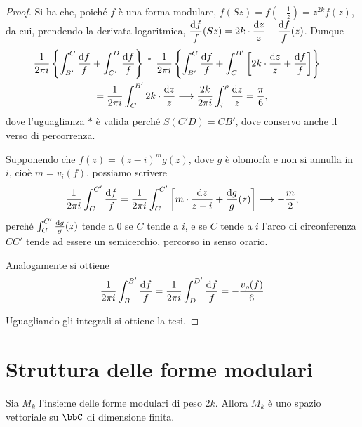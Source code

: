 \begin{proof}
	Si ha che, poiché $f$ è una forma modulare, $f(Sz)=f(-\frac{1}{z})=z^{2k}f(z)$, da cui, prendendo la derivata logaritmica,
	$\displaystyle\frac{\text{d} f}{f}(Sz)=2k\cdot\frac{\text{d} z}{z}+\frac{\text{d} f}{f}(z)$. Dunque
	\begin{multline}
		\frac{1}{2\pi i}\left\{ \int_{B'}^C\frac{\de f}{f} + \int_{C'}^D\frac{\de f}{f} \right\} \overset{*}{=} %
		\frac{1}{2\pi i}\left\{ \int_{B'}^C\frac{\de f}{f} + \int_{C}^{B'} \left[2k \cdot \frac{\de z}{z} + \frac{\de f}{f}\right] \right\} = \\
		= \frac{1}{2\pi i}\int_{C}^{B'} 2k \cdot \frac{\de z}{z} \longrightarrow \frac{2k}{2\pi i}\int_i^\rho \frac{\de z}{z} = \frac{\pi}{6},
	\end{multline}
	dove l'uguaglianza $*$ è valida perché $S(C'D)=CB'$, dove conservo anche il verso di percorrenza.
	
	Supponendo che $f(z)=(z-i)^mg(z)$, dove $g$ è olomorfa e non si annulla in $i$, cioè $m=v_i(f)$, possiamo scrivere
	\begin{equation*}
		\frac{1}{2\pi i}\int_C^{C'}\frac{\de f}{f} = \frac{1}{2\pi i}\int_C^{C'}\left[ m\cdot\frac{\de z}{z-i} + %
		\frac{\de g}{g}(z) \right] \longrightarrow -\frac{m}{2},
	\end{equation*}
	perché $\int_C^{C'}\frac{\text{d} g}{g}(z)$ tende a $0$ se $C$ tende a $i$, e se $C$ tende a $i$ l'arco di circonferenza $CC'$ tende ad essere un semicerchio, percorso in senso orario.
	
	Analogamente si ottiene 
	\begin{equation*}
		\frac{1}{2\pi i}\int_B^{B'}\frac{\text{d} f}{f}=\frac{1}{2\pi i}\int_D^{D'}\frac{\text{d} f}{f}=-\frac{v_\rho(f)}{6}
	\end{equation*}
	
	Uguagliando gli integrali si ottiene la tesi.
\end{proof}

\section{Struttura delle forme modulari}

\begin{corollario}
	Sia $M_k$ l'insieme delle forme modulari di peso $2k$. Allora $M_k$ è uno spazio vettoriale su $\bbC$ di dimensione finita.
\end{corollario}


